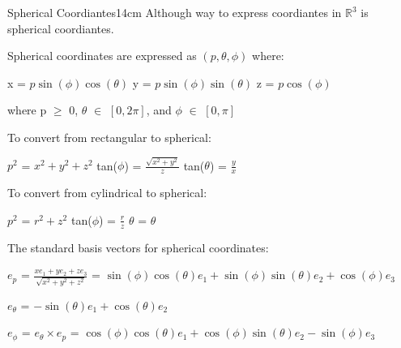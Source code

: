     \newpage



    \begin{definition}{Spherical Coordiantes}{14cm}
        Although way to express coordiantes in $\mathbb{R}^3$ is spherical
        coordiantes.

        {\color{lblue} Spherical coordinates} are expressed as
        $(p,\theta,\phi)$ where:

        \hspace{0.5cm}
        x = $p \sin(\phi) \cos(\theta)$
        \hspace{1cm}
        y = $p \sin(\phi) \sin(\theta)$
        \hspace{1cm}
        z = $p \cos(\phi)$

        where p $\geq$ 0, $\theta$ $\in$ $[0,2\pi]$, and $\phi$ $\in$ $[0,\pi]$

        \vspace{0.3cm}

        To convert from rectangular to spherical:

        \hspace{0.5cm}
        $p^2$ = $x^2 + y^2 + z^2$
        \hspace{1cm}
        tan($\phi$) = $\frac{\sqrt{x^2+y^2}}{z}$
        \hspace{1cm}
        tan($\theta$) = $\frac{y}{x}$

        To convert from cylindrical to spherical:

        \hspace{0.5cm}
        $p^2$ = $r^2 + z^2$
        \hspace{1cm}
        tan($\phi$) = $\frac{r}{z}$
        \hspace{1cm}
        $\theta$ = $\theta$

        \vspace{0.3cm}

        The standard basis vectors for spherical coordinates:

        \hspace{0.5cm}
        $e_p$ = $\frac{xe_1 + ye_2 + ze_3}{\sqrt{x^2+y^2+z^2}}$
        = $\sin(\phi) \cos(\theta)e_1 + \sin(\phi) \sin(\theta)e_2 + \cos(\phi)e_3$

        \hspace{0.5cm}
        $e_{\theta}$
        = $-\sin(\theta)e_1 + \cos(\theta)e_2$

        \hspace{0.5cm}
        $e_{\phi}$
        = $e_{\theta} \times e_p$
        = $\cos(\phi)\cos(\theta)e_1 + \cos(\phi)\sin(\theta)e_2 - \sin(\phi)e_3$
    \end{definition}

